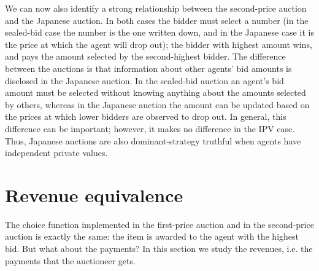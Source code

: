 We can now also identify a strong relationship between the second-price auction and the Japanese
auction.
In both cases the bidder must select a number
(in the sealed-bid case the number is the one written down, and in the Japanese case it is the price at which the agent will drop out); the bidder with highest amount wins, and pays the amount selected by the second-highest bidder. The difference between
the auctions is that information about other agents' bid amounts is disclosed in the Japanese auction. In the sealed-bid auction an agent's bid amount must be selected without knowing anything about the amounts selected by others, whereas in the Japanese auction the amount can be updated based on the prices at which lower bidders are observed to drop out. In general, this difference can be important; however, it makes no difference in the IPV case. Thus, Japanese
auctions are also dominant-strategy truthful when agents have independent private
values.



\section{Revenue equivalence}
\label{sec:auc:5}
The choice function implemented in the first-price auction and in the second-price auction is exactly the same: the item is awarded to the agent with the highest bid. But what about the payments? In this section we study the revenues, i.e. the payments that the auctioneer gets.

